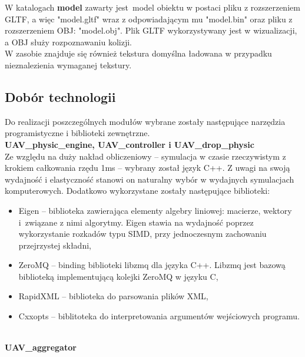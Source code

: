 \documentclass[15pt]{sprawozdanie}
\begin{document}
W katalogach \textbf{model} zawarty jest model obiektu w postaci pliku z rozszerzeniem GLTF, a więc "model.gltf" wraz z odpowiadającym mu "model.bin" oraz pliku z rozszerzeniem OBJ: "model.obj". Plik GLTF wykorzystywany jest w wizualizacji, a OBJ służy rozpoznawaniu kolizji.\\


W zasobie znajduje się również tekstura domyślna ładowana w przypadku nieznalezienia wymaganej tekstury.\\


\newpage


\subsection{Dobór technologii}

Do realizacji poszczególnych modułów wybrane zostały następujące narzędzia programistyczne i biblioteki zewnętrzne.\\


\textbf{UAV\_physic\_engine, UAV\_controller i UAV\_drop\_physic}\\

Ze względu na duży nakład obliczeniowy -- symulacja w czasie rzeczywistym z krokiem całkowania rzędu 1ms -- wybrany został język C++. Z uwagi na swoją wydajność i elastyczność stanowi on naturalny wybór w wydajnych symulacjach komputerowych. Dodatkowo wykorzystane zostały następujące biblioteki:
\begin{itemize}[noitemsep,nolistsep]
	\item Eigen -- biblioteka zawierająca elementy algebry liniowej: macierze, wektory i~związane z nimi algorytmy. Eigen stawia na wydajność poprzez wykorzystanie rozkadów typu SIMD, przy 		jednoczesnym zachowaniu przejrzystej składni,
	\item ZeroMQ -- binding biblioteki libzmq dla języka C++. Libzmq jest bazową biblioteką implementującą kolejki ZeroMQ w języku C,
	\item RapidXML -- biblioteka do parsowania plików XML,
	\item Cxxopts -- biblitoteka do interpretowania argumentów wejściowych programu.
\end{itemize}
\  \\
\textbf{UAV\_aggregator}\\
\end{document}
